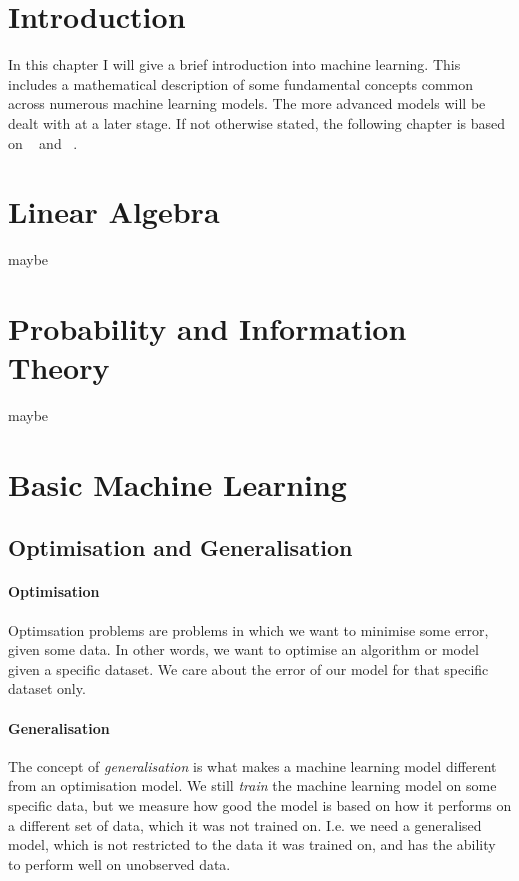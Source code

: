 %
%

\section{Introduction}
In this chapter I will give a brief introduction into machine learning. This includes a mathematical description of some fundamental concepts common across numerous machine learning models. The more advanced models will be dealt with at a later stage. If not otherwise stated, the following chapter is based on ~\cite{Goodfellow-et-al-2016} and ~\cite{hastie2009elements}. 

\section{Linear Algebra}
maybe

\section{Probability and Information Theory}
maybe

\section{Basic Machine Learning}

    \subsection{Optimisation and Generalisation}
        \paragraph{Optimisation}
        Optimsation problems are problems in which we want to minimise some error, given some data. In other words, we want to optimise an algorithm or model given a specific dataset. We care about the error of our model for that specific dataset only.

        \paragraph{Generalisation}
        The concept of \textit{generalisation} is what makes a machine learning model different from an optimisation model. We still \textit{train} the machine learning model on some specific data, but we measure how good the model is based on how it performs on a different set of data, which it was not trained on. I.e. we need a generalised model, which is not restricted to the data it was trained on, and has the ability to perform well on unobserved data. 

